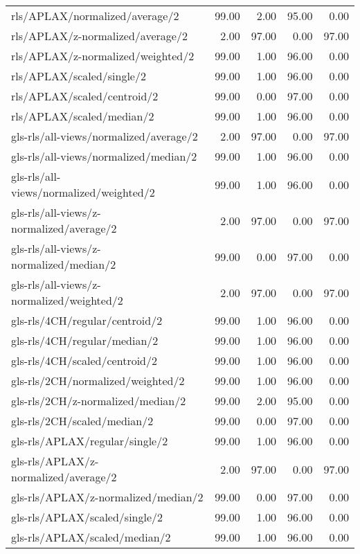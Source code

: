 \begin{longtable}{lrrrr}
    rls/APLAX/normalized/average/2            & 99.00 &  2.00 & 95.00 &  0.00 \\
    rls/APLAX/z-normalized/average/2          &  2.00 & 97.00 &  0.00 & 97.00 \\
    rls/APLAX/z-normalized/weighted/2         & 99.00 &  1.00 & 96.00 &  0.00 \\
    rls/APLAX/scaled/single/2                 & 99.00 &  1.00 & 96.00 &  0.00 \\
    rls/APLAX/scaled/centroid/2               & 99.00 &  0.00 & 97.00 &  0.00 \\
    rls/APLAX/scaled/median/2                 & 99.00 &  1.00 & 96.00 &  0.00 \\
    gls-rls/all-views/normalized/average/2    &  2.00 & 97.00 &  0.00 & 97.00 \\
    gls-rls/all-views/normalized/median/2     & 99.00 &  1.00 & 96.00 &  0.00 \\
    gls-rls/all-views/normalized/weighted/2   & 99.00 &  1.00 & 96.00 &  0.00 \\
    gls-rls/all-views/z-normalized/average/2  &  2.00 & 97.00 &  0.00 & 97.00 \\
    gls-rls/all-views/z-normalized/median/2   & 99.00 &  0.00 & 97.00 &  0.00 \\
    gls-rls/all-views/z-normalized/weighted/2 &  2.00 & 97.00 &  0.00 & 97.00 \\
    gls-rls/4CH/regular/centroid/2            & 99.00 &  1.00 & 96.00 &  0.00 \\
    gls-rls/4CH/regular/median/2              & 99.00 &  1.00 & 96.00 &  0.00 \\
    gls-rls/4CH/scaled/centroid/2             & 99.00 &  1.00 & 96.00 &  0.00 \\
    gls-rls/2CH/normalized/weighted/2         & 99.00 &  1.00 & 96.00 &  0.00 \\
    gls-rls/2CH/z-normalized/median/2         & 99.00 &  2.00 & 95.00 &  0.00 \\
    gls-rls/2CH/scaled/median/2               & 99.00 &  0.00 & 97.00 &  0.00 \\
    gls-rls/APLAX/regular/single/2            & 99.00 &  1.00 & 96.00 &  0.00 \\
    gls-rls/APLAX/z-normalized/average/2      &  2.00 & 97.00 &  0.00 & 97.00 \\
    gls-rls/APLAX/z-normalized/median/2       & 99.00 &  0.00 & 97.00 &  0.00 \\
    gls-rls/APLAX/scaled/single/2             & 99.00 &  1.00 & 96.00 &  0.00 \\
    gls-rls/APLAX/scaled/median/2             & 99.00 &  1.00 & 96.00 &  0.00 \\
    \hline
\end{longtable}
